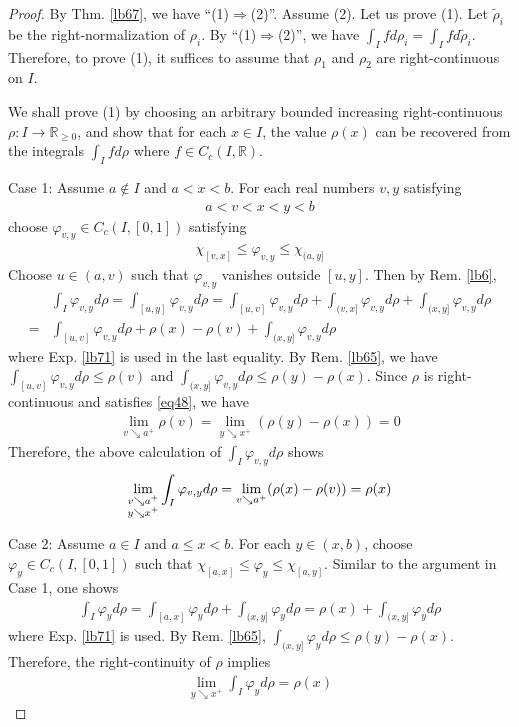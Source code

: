 \documentclass[12pt,b5paper,notitlepage]{article}
\theoremstyle{definition}
\theoremstyle{plain}
\newcommand{\wtd}{\widetilde}
\newcommand{\Rbb}{\mathbb R}
\numberwithin{equation}{section}
\begin{document}
\begin{proof}
By Thm. \ref{lb67}, we have ``(1)$\Rightarrow$(2)''. Assume (2). Let us prove (1). Let $\wtd\rho_i$ be the right-normalization of $\rho_i$. By ``(1)$\Rightarrow$(2)'', we have $\int_I fd\rho_i=\int_I fd\wtd\rho_i$. Therefore, to prove (1), it suffices to assume that $\rho_1$ and $\rho_2$ are right-continuous on $I$.

We shall prove (1) by choosing an arbitrary bounded increasing right-continuous $\rho:I\rightarrow\Rbb_{\geq0}$, and show that for each $x\in I$, the value $\rho(x)$ can be recovered from the integrals $\int_Ifd\rho$ where $f\in C_c(I,\Rbb)$.

Case 1: Assume $a\notin I$ and $a<x<b$. For each real numbers $v,y$ satisfying
\begin{align*}
a<v<x<y<b
\end{align*}
choose $\varphi_{v,y}\in C_c(I,[0,1])$ satisfying
\begin{align*}
\chi_{[v,x]}\leq\varphi_{v,y}\leq \chi_{(a,y]}
\end{align*}
Choose $u\in(a,v)$ such that $\varphi_{v,y}$ vanishes outside $[u,y]$. Then by Rem. \ref{lb6},
\begin{align*}
&\int_I\varphi_{v,y}d\rho=\int_{[u,y]}\varphi_{v,y}d\rho=\int_{[u,v]}\varphi_{v,y}d\rho+\int_{(v,x]}\varphi_{v,y}d\rho+\int_{(x,y]}\varphi_{v,y}d\rho\\
=&\int_{[u,v]}\varphi_{v,y}d\rho+\rho(x)-\rho(v)+\int_{(x,y]}\varphi_{v,y}d\rho
\end{align*}
where Exp. \ref{lb71} is used in the last equality. By Rem. \ref{lb65}, we have $\int_{[u,v]}\varphi_{v,y}d\rho\leq\rho(v)$ and $\int_{(x,y]}\varphi_{v,y}d\rho\leq \rho(y)-\rho(x)$. Since $\rho$ is right-continuous and satisfies \eqref{eq48}, we have
\begin{align*}
\lim_{v\searrow a^+}\rho(v)=\lim_{y\searrow x^+}(\rho(y)-\rho(x))=0
\end{align*}
Therefore, the above calculation of $\int_I\varphi_{v,y}d\rho$ shows
\begin{align*}
\lim_{
\begin{subarray}{c}
v\searrow a^+\\
y\searrow x^+
\end{subarray}}
\int_I \varphi_{v,y}d\rho=\lim_{v\searrow a^+}(\rho(x)-\rho(v))=\rho(x)
\end{align*}



Case 2: Assume $a\in I$ and $a\leq x<b$. For each $y\in(x,b)$, choose $\varphi_y\in C_c(I,[0,1])$ such that $\chi_{[a,x]}\leq\varphi_y\leq\chi_{[a,y]}$. Similar to the argument in Case 1, one shows
\begin{align*}
\int_I\varphi_yd\rho=\int_{[a,x]}\varphi_yd\rho+\int_{(x,y]}\varphi_yd\rho=\rho(x)+\int_{(x,y]}\varphi_yd\rho
\end{align*}
where Exp. \ref{lb71} is used. By Rem. \ref{lb65}, $\int_{(x,y]}\varphi_yd\rho\leq \rho(y)-\rho(x)$. Therefore, the right-continuity of $\rho$ implies
\begin{align*}
\lim_{y\searrow x^+}\int_I \varphi_yd\rho=\rho(x)
\end{align*}



\end{proof}
\end{document}
